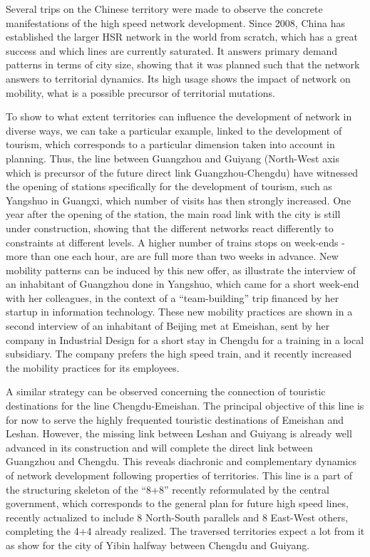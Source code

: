 
Several trips on the Chinese territory were made to observe the concrete manifestations of the high speed network development. Since 2008, China has established the larger HSR network in the world from scratch, which has a great success and which lines are currently saturated. It answers primary demand patterns in terms of city size, showing that it was planned such that the network answers to territorial dynamics. Its high usage shows the impact of network on mobility, what is a possible precursor of territorial mutations.

To show to what extent territories can influence the development of network in diverse ways, we can take a particular example, linked to the development of tourism, which corresponds to a particular dimension taken into account in planning. Thus, the line between Guangzhou and Guiyang (North-West axis which is precursor of the future direct link Guangzhou-Chengdu) have witnessed the opening of stations specifically for the development of tourism, such as Yangshuo in Guangxi, which number of visits has then strongly increased. One year after the opening of the station, the main road link with the city is still under construction, showing that the different networks react differently to constraints at different levels. A higher number of trains stops on week-ends - more than one each hour, are are full more than two weeks in advance. New mobility patterns can be induced by this new offer, as illustrate the interview of an inhabitant of Guangzhou done in Yangshuo, which came for a short week-end with her colleagues, in the context of a ``team-building'' trip financed by her startup in information technology. These new mobility practices are shown in a second interview of an inhabitant of Beijing met at Emeishan, sent by her company in Industrial Design for a short stay in Chengdu for a training in a local subsidiary. The company prefers the high speed train, and it recently increased the mobility practices for its employees.

A similar strategy can be observed concerning the connection of touristic destinations for the line Chengdu-Emeishan. The principal objective of this line is for now to serve the highly frequented touristic destinations of Emeishan and Leshan. However, the missing link between Leshan and Guiyang is already well advanced in its construction and will complete the direct link between Guangzhou and Chengdu. This reveals diachronic and complementary dynamics of network development following properties of territories. This line is a part of the structuring skeleton of the ``8+8'' recently reformulated by the central government, which corresponds to the general plan for future high speed lines, recently actualized to include 8 North-South parallels and 8 East-West others, completing the 4+4 already realized.  The traversed territories expect a lot from it as show \cite{lu2012chengdu} for the city of Yibin halfway between Chengdu and Guiyang.


